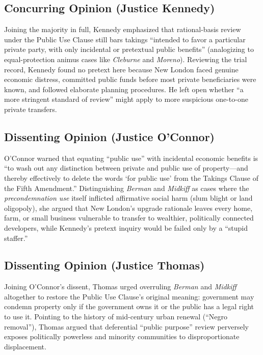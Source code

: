 \documentclass[12pt]{article}
\begin{document}
\subsection{Concurring Opinion (Justice Kennedy)}

Joining the majority in full, Kennedy emphasized that rational-basis review under the Public Use Clause still bars takings ``intended to favor a particular private party, with only incidental or pretextual public benefits'' (analogizing to equal-protection animus cases like \textit{Cleburne} and \textit{Moreno}). Reviewing the trial record, Kennedy found no pretext here because New London faced genuine economic distress, committed public funds before most private beneficiaries were known, and followed elaborate planning procedures. He left open whether ``a more stringent standard of review'' might apply to more suspicious one-to-one private transfers.

\subsection{Dissenting Opinion (Justice O'Connor)}

O'Connor warned that equating ``public use'' with incidental economic benefits is ``to wash out any distinction between private and public use of property---and thereby effectively to delete the words `for public use' from the Takings Clause of the Fifth Amendment.'' Distinguishing \textit{Berman} and \textit{Midkiff} as cases where the \textit{precondemnation use} itself inflicted affirmative social harm (slum blight or land oligopoly), she argued that New London's upgrade rationale leaves every home, farm, or small business vulnerable to transfer to wealthier, politically connected developers, while Kennedy's pretext inquiry would be failed only by a ``stupid staffer.''

\subsection{Dissenting Opinion (Justice Thomas)}

Joining O'Connor's dissent, Thomas urged overruling \textit{Berman} and \textit{Midkiff} altogether to restore the Public Use Clause's original meaning: government may condemn property only if the government owns it or the public has a legal right to use it. Pointing to the history of mid-century urban renewal (``Negro removal''), Thomas argued that deferential ``public purpose'' review perversely exposes politically powerless and minority communities to disproportionate displacement.
\end{document}

